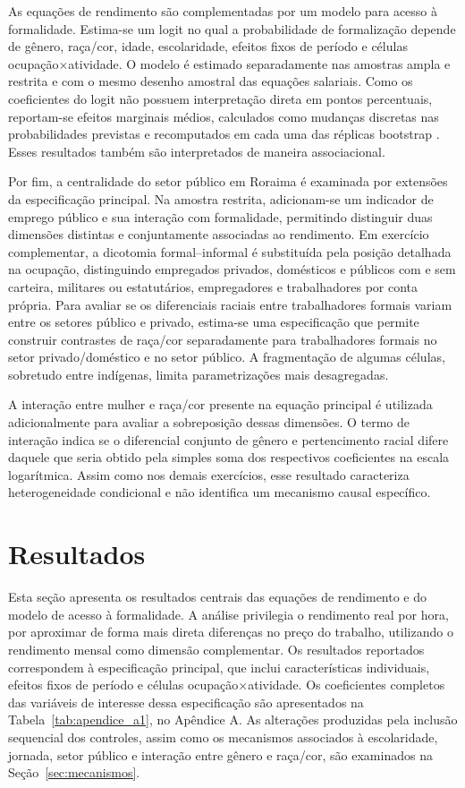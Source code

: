 \documentclass[12pt]{article}
\begin{document}
As equações de rendimento são complementadas por um modelo para acesso à
formalidade. Estima-se um logit no qual a probabilidade de formalização depende
de gênero, raça/cor, idade, escolaridade, efeitos fixos de período e células
ocupação$\times$atividade. O modelo é estimado separadamente nas amostras ampla
e restrita e com o mesmo desenho amostral das equações salariais. Como os
coeficientes do logit não possuem interpretação direta em pontos percentuais,
reportam-se efeitos marginais médios, calculados como mudanças discretas nas
probabilidades previstas e recomputados em cada uma das réplicas bootstrap
\citep{hanmer2013behind}. Esses resultados também são interpretados de maneira
associacional.

Por fim, a centralidade do setor público em Roraima é examinada por extensões
da especificação principal. Na amostra restrita, adicionam-se um indicador de
emprego público e sua interação com formalidade, permitindo distinguir duas
dimensões distintas e conjuntamente associadas ao rendimento. Em exercício
complementar, a dicotomia formal--informal é substituída pela posição detalhada
na ocupação, distinguindo empregados privados, domésticos e públicos com e sem
carteira, militares ou estatutários, empregadores e trabalhadores por conta
própria. Para avaliar se os diferenciais raciais entre trabalhadores formais variam
entre os setores público e privado, estima-se uma especificação que permite
construir contrastes de raça/cor separadamente para trabalhadores formais no
setor privado/doméstico e no setor público. A fragmentação de algumas células, 
sobretudo entre indígenas, limita parametrizações mais desagregadas.

A interação entre mulher e raça/cor presente na equação principal é utilizada
adicionalmente para avaliar a sobreposição dessas dimensões. O termo de
interação indica se o diferencial conjunto de gênero e pertencimento racial
difere daquele que seria obtido pela simples soma dos respectivos coeficientes
na escala logarítmica. Assim como nos demais exercícios, esse resultado
caracteriza heterogeneidade condicional e não identifica um mecanismo causal
específico.

\section{Resultados}
\label{sec:resultados}

Esta seção apresenta os resultados centrais das equações de rendimento e do 
modelo de acesso à formalidade. A análise privilegia o rendimento real por hora, 
por aproximar de forma mais direta diferenças no preço do trabalho, utilizando o 
rendimento mensal como dimensão complementar. Os resultados reportados correspondem 
à especificação principal, que inclui características individuais, efeitos fixos 
de período e células ocupação$\times$atividade. Os coeficientes completos das variáveis 
de interesse dessa especificação são apresentados na Tabela~\ref{tab:apendice_a1}, no Apêndice A. As
alterações produzidas pela inclusão sequencial dos controles, assim como os 
mecanismos associados à escolaridade, jornada, setor público e interação entre 
gênero e raça/cor, são examinados na Seção~\ref{sec:mecanismos}.
\end{document}
